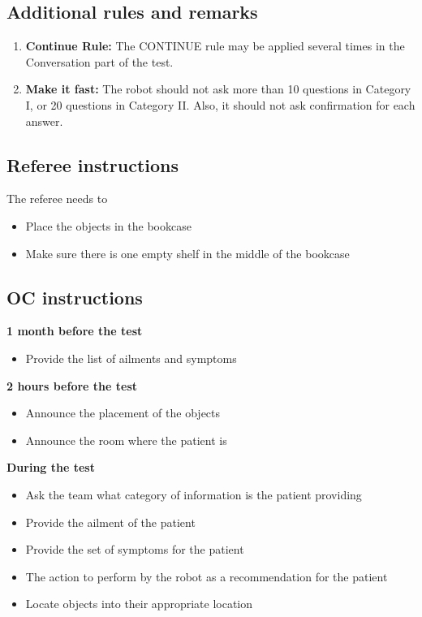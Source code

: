 \subsection{Additional rules and remarks}
\begin{enumerate}
\item \textbf{Continue Rule:} The CONTINUE rule may be applied several times in the Conversation part of the test.
\item \textbf{Make it fast:} The robot should not ask more than 10 questions in Category I, or 20 questions in Category II. Also, it should not ask confirmation for each answer.
\end{enumerate}

\subsection{Referee instructions}

The referee needs to
\begin{itemize}
\item Place the objects in the bookcase
\item Make sure there is one empty shelf in the middle of the bookcase
\end{itemize}

\subsection{OC instructions}

\textbf{1 month before the test}
\begin{itemize}
\item Provide the list of ailments and symptoms
\end{itemize}
\textbf{2 hours before the test}
\begin{itemize}
\item Announce the placement of the objects
\item Announce the room where the patient is
\end{itemize}
\textbf{During the test}
\begin{itemize}
\item Ask the team what category of information is the patient providing
\item Provide the ailment of the patient
\item Provide the set of symptoms for the patient
\item The action to perform by the robot as a recommendation for the patient
\item Locate objects into their appropriate location
\end{itemize}

